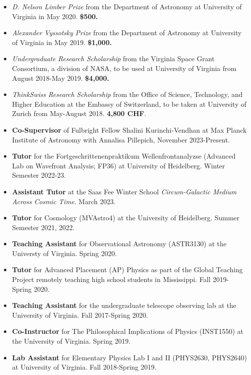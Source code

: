 \documentclass[a4paper,12pt,oneside]{article}
\begin{document}
\begin{itemize}[wide, labelwidth=!, labelindent=-11pt, noitemsep]
    \item {\it D. Nelson Limber Prize} from the Department of Astronomy at University of Virginia in May 2020. {\bf \$500.}
    \item {\it Alexander Vyssotsky Prize} from the Department of Astronomy at University of Virginia in May 2019. {\bf \$1,000.}
    \item {\it Undergraduate Research Scholarship} from the Virginia Space Grant Consortium, a division of NASA, to be used at University of Virginia from August 2018-May 2019. {\bf \$4,000.} 
    \item {\it ThinkSwiss Research Scholarship} from the Office of Science, Technology, and Higher Education at the Embassy of Switzerland, to be taken at University of Zurich from May-August 2018. {\bf 4,800 CHF}.
\end{itemize}

\noindent{}

\begin{itemize}[wide, labelwidth=!, labelindent=-11pt, noitemsep]
    \item {\bf Co-Supervisor} of Fulbright Fellow Shalini Kurinchi-Vendhan at Max Planck Institute of Astronomy with Annalisa Pillepich, November 2023-Present.
    \item {\bf Tutor} for the Fortgeschrittenenpraktikum Wellenfrontanalyzse (Advanced Lab on Wavefront Analysis; FP36) at University of Heidelberg. Winter Semester 2022-23.
    \item {\bf Assistant Tutor} at the Saas Fee Winter School {\it Circum-Galactic Medium Across Cosmic Time}. March 2023. 
    \item {\bf Tutor} for Cosmology (MVAstro4) at the University of Heidelberg. Summer Semester 2021, 2022.
    \item {\bf Teaching Assistant} for Observational Astronomy (ASTR3130) at the Universty of Virginia. Spring 2020.
    \item {\bf Tutor} for Advanced Placement (AP) Physics as part of the Global Teaching Project remotely teaching high school students in Mississippi. Fall 2019-Spring 2020.
    \item {\bf Teaching Assistant} for the undergraduate telescope observing lab at the University of Virginia. Fall 2017-Spring 2020. 
    \item {\bf Co-Instructor} for The Philosophical Implications of Physics (INST1550) at the University of Virginia. Spring 2019.
    \item {\bf Lab Assistant} for Elementary Physics Lab I and II (PHYS2630, PHYS2640) at University of Virginia. Fall 2018-Spring 2019. 
\end{itemize}
\end{document}

